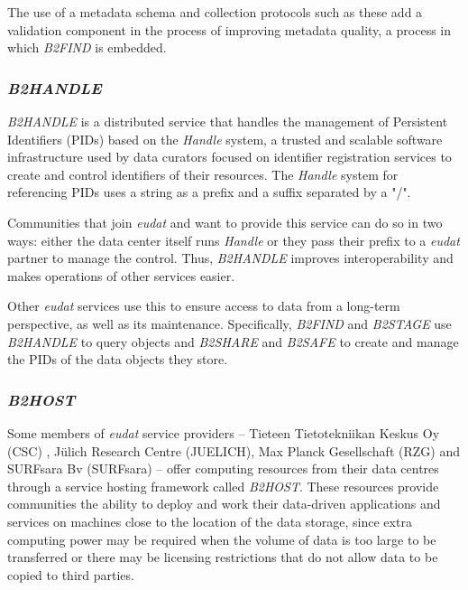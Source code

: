 The use of a metadata schema and collection protocols such as these add a validation component in the process of improving metadata quality, a process in which \textit{B2FIND} is embedded.
  
\subsubsection{\textit{B2HANDLE}}
  
\textit{B2HANDLE} is a distributed service that handles the management of Persistent Identifiers (PIDs) based on the \textit{Handle} system, a trusted and scalable software infrastructure used by data curators focused on identifier registration services to create and control identifiers of their resources. The \textit{Handle} system for referencing PIDs uses a string as a prefix and a suffix separated by a "/". 
  
Communities that join \textit{\gls{eudat}} and want to provide this service can do so in two ways: either the data center itself runs \textit{Handle} or they pass their prefix to a \textit{\gls{eudat}} partner to manage the control. Thus, \textit{B2HANDLE} improves interoperability and makes operations of other services easier.
  
Other \textit{\gls{eudat}} services use this to ensure access to data from a long-term perspective, as well as its maintenance. Specifically, \textit{B2FIND} and \textit{B2STAGE} use \textit{B2HANDLE} to query objects and \textit{B2SHARE} and \textit{B2SAFE} to create and manage the PIDs of the data objects they store.
    
\subsubsection{\textit{B2HOST}}
  
Some members of \textit{\gls{eudat}} service providers -- Tieteen Tietotekniikan Keskus Oy (CSC) , Jülich Research Centre (JUELICH), Max Planck Gesellschaft (RZG) and SURFsara Bv (SURFsara) -- offer computing resources from their data centres through a service hosting framework called \textit{B2HOST}. These resources provide communities the ability to deploy and work their data-driven applications and services on machines close to the location of the data storage, since extra computing power may be required when the volume of data is too large to be transferred or there may be licensing restrictions that do not allow data to be copied to third parties. 
    

